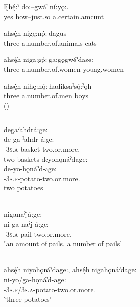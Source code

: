 \ea\label{ex:countingdict5} 
\gll Ęhę́:ˀ do:–gwáˀ ní:yǫ:.\\
yes how–just.so a.certain.amount\\
\cayuga{\glt} 
\z


\ea\label{ex:countingdict6} 
\gll ahsę́h nigę:nǫ́: dagus \\
three a.number.of.animals cats\\
\cayuga{\glt} 
\z


\ea\label{ex:countingdict7} 
\gll ahsę́h niga:gǫ́: ga:gǫgwéˀdase:\\
three a.number.of.women young.women \\
\cayuga{\glt} 
\z


\ea\label{ex:countingdict8} 
\gll ahsę́h ni̱hę:nǫ́: hadiksa̱ˀsǫ́:ˀǫh \\
three a.number.of.men boys\\
\cayuga{\glt}  (\cite{michelson_ontario_2011})
\z

\subsection{ } \label{[+age:] be a number of things (more than two), [de-…+agehagyeˀ] two at a time}


\ea\label{ex:countingdict9}  
\ea degaˀahdrá:ge: \\
\gll de-ga-ˀahdr-á:ge:\\ 
\textsc{{\dualic}-3s.a}-basket-two.or.more.{\stative}\\
\glt two baskets 
\ex deyohǫnáˀdage: \\
\gll de-yo-hǫnáˀd-age:\\
\textsc{{\dualic}-3s.p}-potato-two.or.more.{\stative}\\
\glt two potatoes
\z
\z

\ea\label{ex:countingdict10}  \\
nigana̱ˀjá:ge:\\
\gll ni-ga-na̱ˀj-á:ge:\\
\textsc{{\partitive}-3s.a}-pail-two.or.more.{\stative}\\
\glt ‛an amount of pails, a number of pails' 
\z

\ea\label{ex:countingdict11}   \\
ahsę́h niyohǫnáˀdage:, ahsę́h nigahǫnáˀdage:\\
\gll ni-yo/ga-hǫnáˀd-age:\\
\textsc{{\partitive}-3s.p/3s.a}-potato-two.or.more.{\stative}\\
\glt ‛three potatoes'
\z

